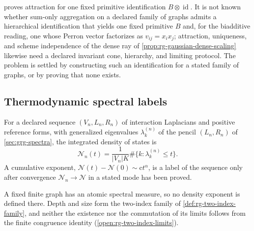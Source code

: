  proves attraction for one fixed primitive
identification \(B\otimes\operatorname{id}\). It is not known whether sum-only
aggregation on a declared family of graphs admits a hierarchical
identification that yields one fixed primitive \(B\) and, for the biadditive
reading, one whose Perron vector factorizes as \(v_{ij}=x_ix_j\); attraction,
uniqueness, and scheme independence of the dense ray of
\cref{prop:rg-gaussian-dense-scaling} likewise need a declared invariant cone,
hierarchy, and limiting protocol. The problem is settled by constructing such
an identification for a stated family of graphs, or by proving that none
exists.

\subsection{Thermodynamic spectral labels}

For a declared sequence \((V_n,L_n,R_n)\) of interaction Laplacians and
positive reference forms, with generalized eigenvalues \(\lambda^{(n)}_k\) of
the pencil \((L_n,R_n)\) of \cref{sec:grg-spectra}, the integrated density of
states is
\begin{equation}
\mathcal N_n(t)
=\frac{1}{\lvert V_n\rvert K}
\#\{k:\lambda_k^{(n)}\leq t\}.
\label{eq:grg-ids}
\end{equation}
A cumulative exponent, \(\mathcal N(t)-\mathcal N(0)\sim\mathrm ct^\alpha\), is a
label of the sequence only after convergence \(\mathcal N_n\to\mathcal N\) in a
stated mode has been proved.

A fixed finite graph has an atomic spectral measure, so no density exponent is
defined there. Depth and size form the two-index family of
\cref{def:rg-two-index-family}, and neither the existence nor the commutation
of its limits follows from the finite congruence identity
(\cref{open:rg-two-index-limits}).
